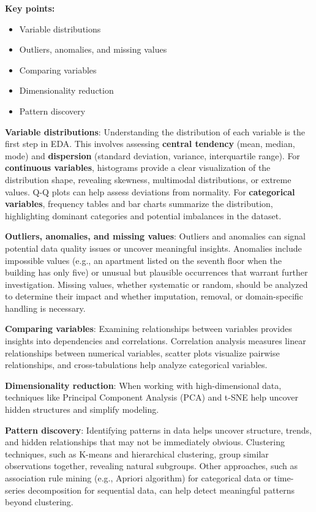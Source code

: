 \documentclass[12pt,openany]{book}
\begin{document}
\textbf{Key points:}
\begin{itemize}
    \item Variable distributions
    \item Outliers, anomalies, and missing values
    \item Comparing variables
    \item Dimensionality reduction
    \item Pattern discovery
\end{itemize}

\textbf{Variable distributions}: Understanding the distribution of each variable is the first step in EDA. This involves assessing \textbf{central tendency} (mean, median, mode) and \textbf{dispersion} (standard deviation, variance, interquartile range). For \textbf{continuous variables}, histograms provide a clear visualization of the distribution shape, revealing skewness, multimodal distributions, or extreme values. Q-Q plots can help assess deviations from normality. For \textbf{categorical variables}, frequency tables and bar charts summarize the distribution, highlighting dominant categories and potential imbalances in the dataset.
\newline

\textbf{Outliers, anomalies, and missing values}: Outliers and anomalies can signal potential data quality issues or uncover meaningful insights. Anomalies include impossible values (e.g., an apartment listed on the seventh floor when the building has only five) or unusual but plausible occurrences that warrant further investigation. Missing values, whether systematic or random, should be analyzed to determine their impact and whether imputation, removal, or domain-specific handling is necessary.
\newline

\textbf{Comparing variables}: Examining relationships between variables provides insights into dependencies and correlations. Correlation analysis measures linear relationships between numerical variables, scatter plots visualize pairwise relationships, and cross-tabulations help analyze categorical variables.
\newline

\textbf{Dimensionality reduction}: When working with high-dimensional data, techniques like Principal Component Analysis (PCA) and t-SNE help uncover hidden structures and simplify modeling.
\newline

\textbf{Pattern discovery}: Identifying patterns in data helps uncover structure, trends, and hidden relationships that may not be immediately obvious. Clustering techniques, such as K-means and hierarchical clustering, group similar observations together, revealing natural subgroups. Other approaches, such as association rule mining (e.g., Apriori algorithm) for categorical data or time-series decomposition for sequential data, can help detect meaningful patterns beyond clustering.
\newline
\end{document}
